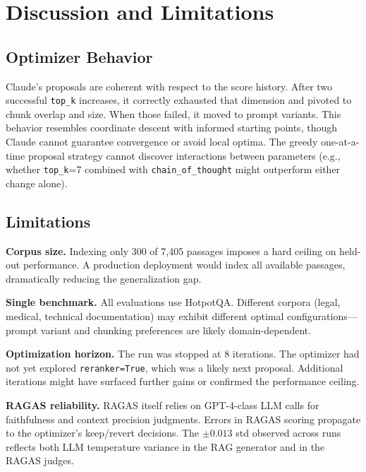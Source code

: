 \documentclass[11pt,a4paper]{article}
\begin{document}
\section{Discussion and Limitations}

\subsection{Optimizer Behavior}

Claude's proposals are coherent with respect to the score history. After two
successful \texttt{top\_k} increases, it correctly exhausted that dimension and
pivoted to chunk overlap and size. When those failed, it moved to prompt
variants. This behavior resembles coordinate descent with informed starting
points, though Claude cannot guarantee convergence or avoid local optima. The
greedy one-at-a-time proposal strategy cannot discover interactions between
parameters (e.g., whether \texttt{top\_k}=7 combined with
\texttt{chain\_of\_thought} might outperform either change alone).

\subsection{Limitations}

\textbf{Corpus size.} Indexing only 300 of 7,405 passages imposes a hard
ceiling on held-out performance. A production deployment would index all
available passages, dramatically reducing the generalization gap.

\textbf{Single benchmark.} All evaluations use HotpotQA. Different corpora
(legal, medical, technical documentation) may exhibit different optimal
configurations---prompt variant and chunking preferences are likely
domain-dependent.

\textbf{Optimization horizon.} The run was stopped at 8 iterations. The
optimizer had not yet explored \texttt{reranker=True}, which was a likely next
proposal. Additional iterations might have surfaced further gains or confirmed
the performance ceiling.

\textbf{RAGAS reliability.} RAGAS itself relies on GPT-4-class LLM calls for
faithfulness and context precision judgments. Errors in RAGAS scoring propagate
to the optimizer's keep/revert decisions. The $\pm0.013$ std observed across
runs reflects both LLM temperature variance in the RAG generator and in the
RAGAS judges.
\end{document}
